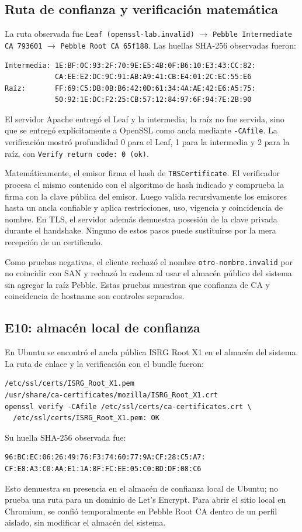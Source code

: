 \documentclass[11pt,a4paper]{article}
\begin{document}
\subsection{Ruta de confianza y verificación matemática}
La ruta observada fue
\texttt{Leaf (openssl-lab.invalid)} $\rightarrow$
\texttt{Pebble Intermediate CA 793601} $\rightarrow$
\texttt{Pebble Root CA 65f188}. Las huellas SHA-256 observadas fueron:
\begin{verbatim}
Intermedia: 1E:BF:0C:93:2F:70:9E:E5:4B:0F:B6:10:E3:43:CC:82:
            CA:EE:E2:DC:9C:91:AB:A9:41:CB:E4:01:2C:EC:55:E6
Raíz:       FF:69:C5:DB:0B:B6:42:0D:61:34:4A:AE:42:E6:A5:75:
            50:92:1E:DC:F2:25:CB:57:12:84:97:6F:94:7E:2B:90
\end{verbatim}
El servidor Apache entregó el Leaf y la intermedia; la raíz no fue servida,
sino que se entregó explícitamente a OpenSSL como
ancla mediante \texttt{-CAfile}. La verificación mostró profundidad 0 para el
Leaf, 1 para la intermedia y 2 para la raíz, con
\texttt{Verify return code: 0 (ok)}.

Matemáticamente, el emisor firma el hash de \texttt{TBSCertificate}. El
verificador procesa el mismo contenido con el algoritmo de hash indicado y
comprueba la firma con la clave pública del emisor. Luego valida
recursivamente los emisores hasta un ancla confiable y aplica restricciones,
uso, vigencia y coincidencia de nombre. En TLS, el servidor además demuestra
posesión de la clave privada durante el handshake. Ninguno de estos pasos
puede sustituirse por la mera recepción de un certificado.

Como pruebas negativas, el cliente rechazó el nombre
\texttt{otro-nombre.invalid} por no coincidir con SAN y rechazó la cadena al
usar el almacén público del sistema sin agregar la raíz Pebble. Estas pruebas
muestran que confianza de CA y coincidencia de hostname son controles
separados.

\subsection{E10: almacén local de confianza}
En Ubuntu se encontró el ancla pública ISRG Root X1 en el almacén del sistema.
La ruta de enlace y la verificación con el bundle fueron:
\begin{verbatim}
/etc/ssl/certs/ISRG_Root_X1.pem
/usr/share/ca-certificates/mozilla/ISRG_Root_X1.crt
openssl verify -CAfile /etc/ssl/certs/ca-certificates.crt \
  /etc/ssl/certs/ISRG_Root_X1.pem: OK
\end{verbatim}
Su huella SHA-256 observada fue:
\begin{verbatim}
96:BC:EC:06:26:49:76:F3:74:60:77:9A:CF:28:C5:A7:
CF:E8:A3:C0:AA:E1:1A:8F:FC:EE:05:C0:BD:DF:08:C6
\end{verbatim}
Esto demuestra su presencia en el almacén de confianza local de Ubuntu; no
prueba una ruta para un dominio de Let's Encrypt. Para abrir el sitio local en
Chromium, se confió temporalmente en Pebble Root CA dentro de un perfil
aislado, sin modificar el almacén del sistema.
\end{document}
